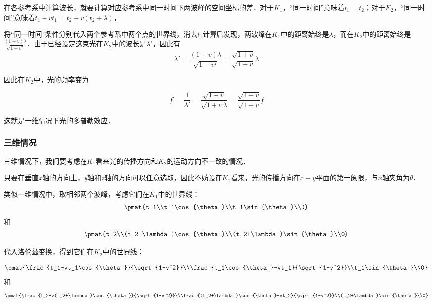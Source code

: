 在各参考系中计算波长，就要计算对应参考系中同一时间下两波峰的空间坐标的差．对于$K_1$，“同一时间”意味着$t_1=t_2$；对于$K_2$，“同一时间”意味着$t_1-vt_1=t_2-v(t_2+\lambda)$，

将“同一时间”条件分别代入两个参考系中两个点的世界线，消去$t_1$计算后发现，两波峰在$K_1$中的距离始终是$\lambda$，而在$K_2$中的距离始终是$\frac{(1+v)\lambda}{\sqrt{1-v^2}}$．由于已经设定这束光在$K_2$中的波长是$\lambda'$，因此有
\begin{equation}
\lambda'=\frac{(1+v)\lambda}{\sqrt{1-v^2}}=\frac{\sqrt{1+v}}{\sqrt{1-v}}\lambda
\end{equation}

因此在$K_2$中，光的频率变为

\begin{equation}\label{RelDop_eq2}
f'=\frac{1}{\lambda'}=\frac{\sqrt{1-v}}{\sqrt{1+v}\lambda}=\frac{\sqrt{1-v}}{\sqrt{1+v}}f
\end{equation}

这就是一维情况下光的多普勒效应．

\subsubsection{三维情况}

三维情况下，我们要考虑在$K_1$看来光的传播方向和$K_2$的运动方向不一致的情况．

只要在垂直$x$轴的方向上，$y$轴和$z$轴的方向可以任意选取，因此不妨设在$K_1$看来，光的传播方向在$x-y$平面的第一象限，与$x$轴夹角为$\theta$．

类似一维情况中，取相邻两个波峰，考虑它们在$K_1$中的世界线：
\begin{equation}
\pmat{t_1\\t_1\cos{\theta}\\t_1\sin{\theta}\\0}
\end{equation}
和
\begin{equation}
\pmat{t_2\\(t_2+\lambda)\cos{\theta}\\(t_2+\lambda)\sin{\theta}\\0}
\end{equation}

代入洛伦兹变换，得到它们在$K_2$中的世界线：

\begin{equation}
\pmat{\frac{t_1-vt_1\cos{\theta}}{\sqrt{1-v^2}}\\\frac{t_1\cos{\theta}-vt_1}{\sqrt{1-v^2}}\\t_1\sin{\theta}\\0}
\end{equation}
和
\begin{equation}
\pmat{\frac{t_2-v(t_2+\lambda)\cos{\theta}}{\sqrt{1-v^2}}\\\frac{(t_2+\lambda)\cos{\theta}-vt_2}{\sqrt{1-v^2}}\\(t_2+\lambda)\sin{\theta}\\0}
\end{equation}

